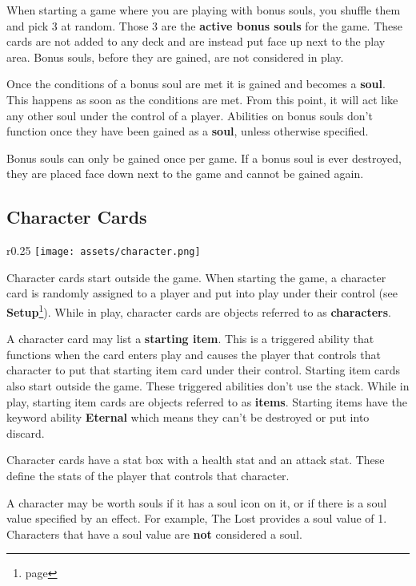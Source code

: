 \documentclass[10pt, a4paper, twoside]{article} %
\begin{document}
    When starting a game where you are playing with bonus souls, you shuffle them and pick 3 at random. Those 3 are the \textbf{active bonus souls} for the game. These cards are not added to any deck and are instead put face up next to the play area. Bonus souls, before they are gained, are not considered in play.

    Once the conditions of a bonus soul are met it is gained and becomes a \textbf{soul}. This happens as soon as the conditions are met. From this point, it will act like any other soul under the control of a player. Abilities on bonus souls don’t function once they have been gained as a \textbf{soul}, unless otherwise specified.

    Bonus souls can only be gained once per game. If a bonus soul is ever destroyed, they are placed face down next to the game and cannot be gained again.

    \subsection{Character Cards}
    \begin{wrapfigure}{r}{0.25\textwidth}
        \centering
        \texttt{[image: assets/character.png]}
    \end{wrapfigure}
    Character cards start outside the game. When starting the game, a character card is randomly assigned to a player and put into play under their control (see \textbf{Setup}\footnote{page \pageref{setup}}). While in play, character cards are objects referred to as \textbf{characters}.
    
    A character card may list a \textbf{starting item}. This is a triggered ability that functions when the card enters play and causes the player that controls that character to put that starting item card under their control. Starting item cards also start outside the game. These triggered abilities don’t use the stack. While in play, starting item cards are objects referred to as \textbf{items}. Starting items have the keyword ability \textbf{Eternal} which means they can’t be destroyed or put into discard.
    
    Character cards have a stat box with a health stat and an attack stat. These define the stats of the player that controls that character.
    
    A character may be worth souls if it has a soul icon on it, or if there is a soul value specified by an effect. For example, The Lost provides a soul value of 1. Characters that have a soul value are \textbf{not} considered a soul.
\end{document}
